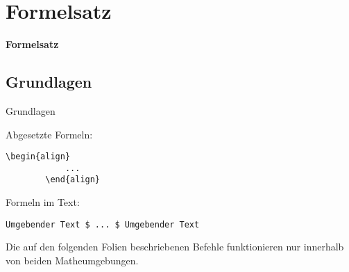 \documentclass["WS\space 16-17\space -\space LaTeX-Kurs\space -\space Praesentation\space -\space 1.tex"]{subfiles}
\begin{document}
\section{Formelsatz}
\begin{frame}[c]
	\begin{center}
		\LARGE \textbf{Formelsatz}
	\end{center}
\end{frame}
\subsection{Grundlagen}
\begin{frame}[c]
	\begin{center}
		\large Grundlagen
	\end{center}
\end{frame}
\begin{frame}[fragile]
	Abgesetzte Formeln:
	\begin{lstlisting}[gobble=8]
	    \begin{align}
		    ...
	    \end{align}
	\end{lstlisting}
	Formeln im Text:
	\begin{lstlisting}[gobble=8]
	    Umgebender Text $ ... $ Umgebender Text
	\end{lstlisting}
	
	Die auf den folgenden Folien beschriebenen Befehle funktionieren nur innerhalb von beiden Matheumgebungen.
\end{frame}
\end{document}
